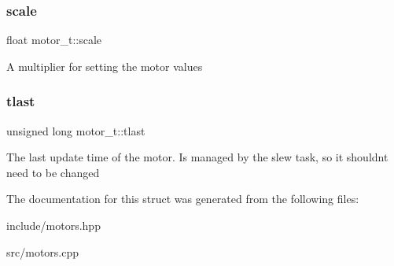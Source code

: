 \subsubsection{\texorpdfstring{scale}{scale}}
{\footnotesize\ttfamily float motor\+\_\+t\+::scale}

A multiplier for setting the motor values \mbox{\label{structmotor__t_a4f00b961c42d53610d71bb90efdcd089}} 
\subsubsection{\texorpdfstring{tlast}{tlast}}
{\footnotesize\ttfamily unsigned long motor\+\_\+t\+::tlast}

The last update time of the motor. Is managed by the slew task, so it shouldn\textquotesingle{}t need to be changed 

The documentation for this struct was generated from the following files\+:\begin{DoxyCompactItemize}
\item 
include/motors.\+hpp\item 
src/motors.\+cpp\end{DoxyCompactItemize}
